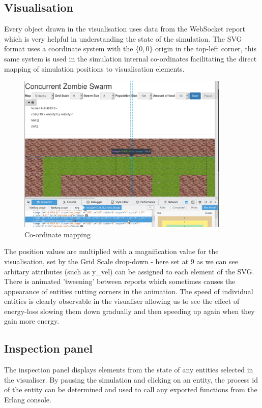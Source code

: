 \subsection{Visualisation}
Every object drawn in the visualisation uses data from the WebSocket report which is very helpful in understanding the state of the simulation. The SVG format uses a coordinate system with the \( \{ 0,0 \} \) origin in the top-left corner, this same system is used in the simulation internal co-ordinates facilitating the direct mapping of simulation positions to visualisation elements. 
\begin{figure}[h]
  \centering
  \includegraphics[width=0.9\textwidth]{img/co-ordinates.png}
\caption{Co-ordinate mapping}
    \label{fig:co-ordinate mapping}
\end{figure}
The position values are multiplied with a magnification value for the visualisation, set by the Grid Scale drop-down - here set at \(9\) as we can see arbitary attributes (such as y\_vel) can be assigned to each element of the SVG.
There is animated 'tweening' between reports which sometimes causes the appearance of entities cutting corners in the animation. The speed of individual entities is clearly observable in the visualiser allowing us to see the effect of energy-loss slowing them down gradually and then speeding up again when they gain more energy.
\subsection{Inspection panel}
The inspection panel displays elements from the state of any entities selected in the visualiser. By pausing the simulation and clicking on an entity, the process id of the entity can be determined and used to call any exported functions from the Erlang console.
